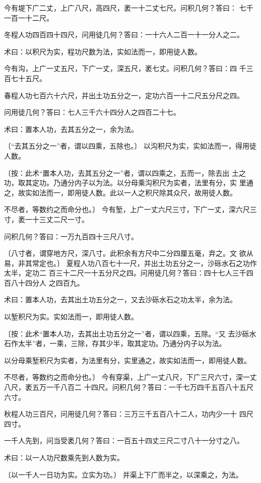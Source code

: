 \documentclass[a4paper,12pt,UTF8,twoside]{ctexbook}
\begin{document}
今有堤下广二丈，上广八尺，高四尺，袤一十二丈七尺。问积几何？答曰： 七千一百一十二尺。

冬程人功四百四十四尺，问用徒几何？答曰：一十六人二百一十一分人之二。

术曰：以积尺为实，程功尺数为法，实如法而一，即用徒人数。

今有沟，上广一丈五尺，下广一丈，深五尺，袤七丈。问积几何？答曰：四 千三百七十五尺。

春程人功七百六十六尺，并出土功五分之一，定功六百一十二尺五分尺之四。

问用徒几何？答曰：七人三千六十四分人之四百二十七。

术曰：置本人功，去其五分之一，余为法。

〔“去其五分之一”者，谓以四乘，五除也。〕 以沟积尺为实，实如法而一，得用徒人数。

〔按：此术“置本人功，去其五分之一”者，谓以四乘之，五而一，除去出 土之功，取其定功。乃通分内子以为法。以分母乘沟积尺为实者，法里有分，实 里通之，故实如法而一，即用徒人数。此以一人之积尺除其众尺，故用徒人数。

不尽者，等数约之而命分也。〕 今有堑，上广一丈六尺三寸，下广一丈，深六尺三寸，袤一十三丈二尺一寸。

问积几何？答曰：一万九百四十三尺八寸。

〔八寸者，谓穿地方尺，深八寸。此积余有方尺中二分四厘五毫，弃之。文 欲从易，非其常定也。〕 夏程人功八百七十一尺，并出土功五分之一，沙砾水石之功作太半，定功二 百三十二尺一十五分尺之四。问用徒几何？答曰：四十七人三千四百八十四分人 之四百九。

术曰：置本人功，去其出土功五分之一，又去沙砾水石之功太半，余为法。

以堑积尺为实。实如法而一，即用徒人数。

〔按：此术“置本人功，去其出土功五分之一”者，谓以四乘，五除。“又 去沙砾水石作太半”者，一乘，三除，存其少半，取其定功。乃通分内子以为法。

以分母乘堑积尺为实者，为法里有分，实里通之，故实如法而一，即用徒人数。

不尽者，等数约之而命分也。〕 今有穿渠，上广一丈八尺，下广三尺六寸，深一丈八尺，袤五万一千八百二 十四尺。问积几何？答曰：一千七万四千五百八十五尺六寸。

秋程人功三百尺，问用徒几何？答曰：三万三千五百八十二人，功内少一十 四尺四寸。

一千人先到，问当受袤几何？答曰：一百五十四丈三尺二寸八十一分寸之八。

术曰：以一人功尺数乘先到人数为实。

〔以一千人一日功为实。立实为功。〕 并渠上下广而半之，以深乘之，为法。
\end{document}

